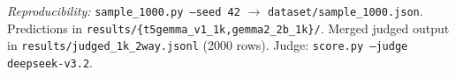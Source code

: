 \documentclass[11pt]{article}
\begin{document}
\medskip
\noindent\emph{Reproducibility:} \texttt{sample\_1000.py --seed 42} $\to$
\texttt{dataset/sample\_1000.json}. Predictions in
\texttt{results/\{t5gemma\_v1\_1k,gemma2\_2b\_1k\}/}. Merged judged output
in \texttt{results/judged\_1k\_2way.jsonl} (2000 rows). Judge:
\texttt{score.py --judge deepseek-v3.2}.
\end{document}
